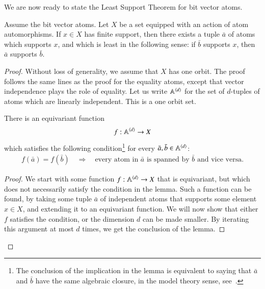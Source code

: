 We are now ready to state the Least Support Theorem for bit vector atoms. 


\begin{theorem}\label{thm:least-support-bit} Assume the bit vector atoms. Let $X$ be a set equipped with an action of atom automorphisms. If $x \in X$ has finite support, then there exists a tuple $\bar a$ of atoms which supports $x$, and which is least in the following sense: if $\bar b$ supports $x$, then $\bar a$ supports $\bar b$. 
\end{theorem}

\begin{proof}
	Without loss of generality, we assume that $X$ has one orbit.
		The proof follows the same lines as the proof for the equality atoms,  except that vector independence plays the role of equality. Let us write $\mathbb A^{\langle d \rangle}$ for the set of $d$-tuples of  atoms which are linearly independent. This is a one orbit set. 
	
\begin{lemma}
	There is an equivariant function 
	\begin{align*}
		f : \mathbb A^{\langle d \rangle} \to X
	   \end{align*}
	   which satisfies the following condition\footnote{The conclusion of the implication in the lemma is equivalent to saying that $\bar a$ and $\bar b$ have the same algebraic closure, in the model theory sense, see~\cite[Chapter 4]{hodges1993model}.} for every $\bar a, \bar b \in \mathbb A^{\langle d \rangle}$: 
	   \begin{align*}
	   f(\bar a) = f(\bar b) 
	   \quad \Rightarrow \quad 
	   \text{every atom in $\bar a$ is spanned by $\bar b$ and vice versa.}
	   \end{align*}
\end{lemma}
\begin{proof}
	We start with some function $f : \mathbb A^{\langle d \rangle} \to X$ that is equivariant, but which does not necessarily satisfy the condition in the lemma. Such a function can be found, by taking some tuple $\bar a$ of independent atoms that supports some element $x \in X$, and extending it to an equivariant function. We will now show that  either $f$ satisfies  the condition, or  the dimension $d$ can be made smaller. By iterating this argument at most $d$ times, we get the conclusion of the lemma.
	 

\end{proof}
\end{proof}
